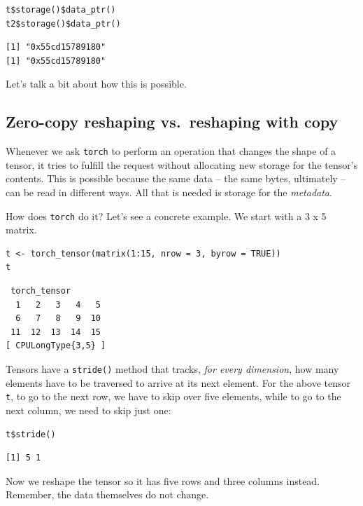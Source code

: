 \documentclass[
  letterpaper,
]{krantz}
\begin{document}
\begin{verbatim}
t$storage()$data_ptr()
t2$storage()$data_ptr()
\end{verbatim}

\begin{verbatim}
[1] "0x55cd15789180"
[1] "0x55cd15789180"
\end{verbatim}

Let's talk a bit about how this is possible.

\hypertarget{zero-copy-reshaping-vs.-reshaping-with-copy}{%
\subsection{Zero-copy reshaping vs.~reshaping with
copy}\label{zero-copy-reshaping-vs.-reshaping-with-copy}}

Whenever we ask \texttt{torch} to perform an operation that changes the
shape of a tensor, it tries to fulfill the request without allocating
new storage for the tensor's contents. This is possible because the same
data -- the same bytes, ultimately -- can be read in different ways. All
that is needed is storage for the \emph{metadata}.

How does \texttt{torch} do it? Let's see a concrete example. We start
with a 3 x 5 matrix.

\begin{verbatim}
t <- torch_tensor(matrix(1:15, nrow = 3, byrow = TRUE))
t
\end{verbatim}

\begin{verbatim}
 torch_tensor
  1   2   3   4   5
  6   7   8   9  10
 11  12  13  14  15
[ CPULongType{3,5} ]
\end{verbatim}

Tensors have a \texttt{stride()} method that tracks, \emph{for every
dimension}, how many elements have to be traversed to arrive at its next
element. For the above tensor \texttt{t}, to go to the next row, we have
to skip over five elements, while to go to the next column, we need to
skip just one:

\begin{verbatim}
t$stride()
\end{verbatim}

\begin{verbatim}
[1] 5 1
\end{verbatim}

Now we reshape the tensor so it has five rows and three columns instead.
Remember, the data themselves do not change.
\end{document}
